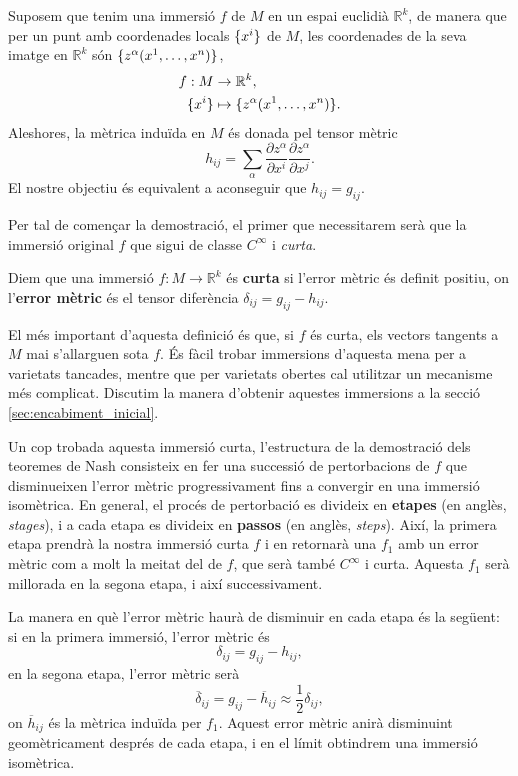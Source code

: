 Suposem que tenim una immersió $f$ de $M$ en un espai euclidià $\mathbb R^k$, de manera que per un punt amb coordenades locals $\{x^i\}$ de $M$, les coordenades de la seva imatge en $\mathbb R^k$ són $\{z^\alpha(x^1, \dots, x^n)\}$,
\begin{align*}
    f:M&\to \mathbb R^k, \\
    \{x^i\} &\mapsto \{z^\alpha(x^1, \dots, x^n)\}. 
\end{align*}
Aleshores, la mètrica induïda en $M$ és donada pel tensor mètric
\begin{equation*}
    h_{ij} = \sum_\alpha \frac{\partial z^\alpha}{\partial x^i}\frac{\partial z^\alpha}{\partial x^j}.
\end{equation*}
El nostre objectiu és equivalent a aconseguir que $h_{ij}=g_{ij}.$

Per tal de començar la demostració, el primer que necessitarem serà que la immersió original $f$ que sigui de classe $C^\infty$ i \textit{curta}.
\begin{defi}
    Diem que una immersió $f:M\to \mathbb R^k$ és \textbf{curta} si l'error mètric és definit positiu, on l'\textbf{error mètric} és el tensor diferència $\delta_{ij} = g_{ij} - h_{ij}$.
\end{defi}
El més important d'aquesta definició és que, si $f$ és curta, els vectors tangents a $M$ mai s'allarguen sota $f$. És fàcil trobar immersions d'aquesta mena per a varietats tancades, mentre que per varietats obertes cal utilitzar un mecanisme més complicat. Discutim la manera d'obtenir aquestes immersions a la secció \ref{sec:encabiment_inicial}.

Un cop trobada aquesta immersió curta, l'estructura de la demostració dels teoremes de Nash consisteix en fer una successió de pertorbacions de $f$ que disminueixen l'error mètric progressivament fins a convergir en una immersió isomètrica. En general, el procés de pertorbació es divideix en \textbf{etapes} (en anglès, \textit{stages}), i a cada etapa es divideix en \textbf{passos} (en anglès, \textit{steps}). Així, la primera etapa prendrà la nostra immersió curta $f$ i en retornarà una $f_1$ amb un error mètric com a molt la meitat del de $f$, que serà també $C^\infty$ i curta. Aquesta $f_1$ serà millorada en la segona etapa, i així successivament.

La manera en què l'error mètric haurà de disminuir en cada etapa és la següent: si en la primera immersió, l'error mètric és 
\begin{equation*}
    \delta_{ij} = g_{ij}-h_{ij},
\end{equation*}
en la segona etapa, l'error mètric serà
\begin{equation*}
    \overline\delta_{ij} = g_{ij}-\overline{h}_{ij}\approx \frac12\delta_{ij},
\end{equation*}
on $\overline{h}_{ij}$ és la mètrica induïda per $f_1$. Aquest error mètric anirà disminuint geomètricament després de cada etapa, i en el límit obtindrem una immersió isomètrica.

